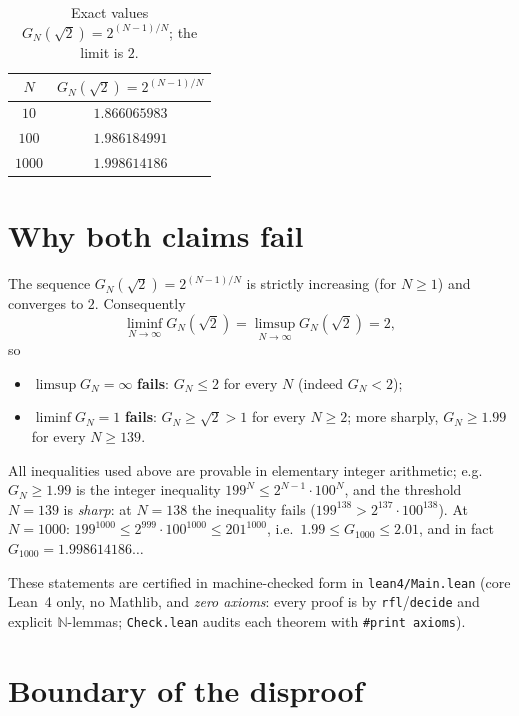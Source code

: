 \documentclass[11pt]{article}
\begin{document}
\begin{table}[h]
\centering
\begin{tabular}{cc}
\toprule
$N$ & $G_N(\sqrt2)=2^{(N-1)/N}$ \\
\midrule
$10$   & $1.866065983$ \\
$100$  & $1.986184991$ \\
$1000$ & $1.998614186$ \\
\bottomrule
\end{tabular}
\caption{Exact values $G_N(\sqrt2)=2^{(N-1)/N}$; the limit is $2$.}
\end{table}

\section{Why both claims fail}

The sequence $G_N(\sqrt2)=2^{(N-1)/N}$ is strictly increasing (for $N\ge1$) and converges to
$2$. Consequently
\[
\liminf_{N\to\infty}G_N(\sqrt2)=\limsup_{N\to\infty}G_N(\sqrt2)=2,
\]
so

\begin{itemize}
\item $\limsup G_N=\infty$ \textbf{fails}: $G_N\le 2$ for every $N$ (indeed $G_N<2$);
\item $\liminf G_N=1$ \textbf{fails}: $G_N\ge\sqrt2>1$ for every $N\ge2$; more sharply,
      $G_N\ge1.99$ for every $N\ge139$.
\end{itemize}

All inequalities used above are provable in elementary integer arithmetic; e.g.\
$G_N\ge1.99$ is the integer inequality $199^N\le 2^{N-1}\cdot 100^N$, and the threshold
$N=139$ is \emph{sharp}: at $N=138$ the inequality fails ($199^{138}>2^{137}\cdot100^{138}$).
At $N=1000$: $199^{1000}\le 2^{999}\cdot100^{1000}\le 201^{1000}$, i.e.\
$1.99\le G_{1000}\le 2.01$, and in fact $G_{1000}=1.998614186\dots$

These statements are certified in machine-checked form in \texttt{lean4/Main.lean}
(core Lean~4 only, no Mathlib, and \emph{zero axioms}: every proof is by
\texttt{rfl}/\texttt{decide} and explicit $\mathbb{N}$-lemmas; \texttt{Check.lean} audits
each theorem with \texttt{\#print axioms}).

\section{Boundary of the disproof}
\end{document}
